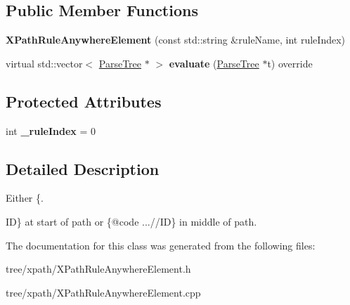 \subsection*{Public Member Functions}
\begin{DoxyCompactItemize}
\item 
\mbox{\label{classantlr4_1_1tree_1_1xpath_1_1XPathRuleAnywhereElement_a776dc679aecb78ecadee80b6595538f2}} 
{\bfseries X\+Path\+Rule\+Anywhere\+Element} (const std\+::string \&rule\+Name, int rule\+Index)
\item 
\mbox{\label{classantlr4_1_1tree_1_1xpath_1_1XPathRuleAnywhereElement_acbef6ff6353a0d58fb08b2382eb85450}} 
virtual std\+::vector$<$ \hyperlink{classantlr4_1_1tree_1_1ParseTree}{Parse\+Tree} $\ast$ $>$ {\bfseries evaluate} (\hyperlink{classantlr4_1_1tree_1_1ParseTree}{Parse\+Tree} $\ast$t) override
\end{DoxyCompactItemize}
\subsection*{Protected Attributes}
\begin{DoxyCompactItemize}
\item 
\mbox{\label{classantlr4_1_1tree_1_1xpath_1_1XPathRuleAnywhereElement_ae85a82175111d3edfac1e5b3b70b4979}} 
int {\bfseries \+\_\+rule\+Index} = 0
\end{DoxyCompactItemize}


\subsection{Detailed Description}
Either \{. 


\begin{DoxyCode}
ID\} at start of path or \{@code ...\textcolor{comment}{//ID\} in middle of path. }
\end{DoxyCode}


The documentation for this class was generated from the following files\+:\begin{DoxyCompactItemize}
\item 
tree/xpath/X\+Path\+Rule\+Anywhere\+Element.\+h\item 
tree/xpath/X\+Path\+Rule\+Anywhere\+Element.\+cpp\end{DoxyCompactItemize}
